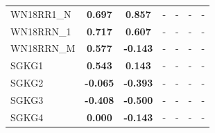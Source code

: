 \begin{table}[t]
{\begin{tabular}{l||cc||cc||cc}
WN18RR1\_N & \textbf{0.697} & \textbf{0.857} & - & - & - & - \\
WN18RRN\_1 & \textbf{0.717} & \textbf{0.607} & - & - & - & - \\
WN18RRN\_M & \textbf{0.577} & \textbf{-0.143} & - & - & - & - \\
\hline
SGKG1 & \textbf{0.543} & \textbf{0.143} & - & - & - & - \\
SGKG2 & \textbf{-0.065} & \textbf{-0.393} & - & - & - & - \\
SGKG3 & \textbf{-0.408} & \textbf{-0.500} & - & - & - & - \\
SGKG4 & \textbf{0.000} & \textbf{-0.143} & - & - & - & - \\
\hline
\end{tabular}%
}
\end{table}
